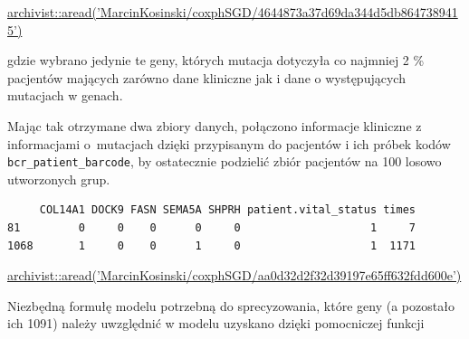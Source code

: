 \href{https://github.com/MarcinKosinski/coxphSGD/blob/master/gallery/4644873a37d69da344d5db8647389415.rda?raw=true}{archivist::aread('MarcinKosinski/coxphSGD/4644873a37d69da344d5db8647389415')}

gdzie wybrano jedynie te geny, których mutacja dotyczyła co najmniej 2
\% pacjentów mających zarówno dane kliniczne jak i dane o występujących
mutacjach w genach.

Mając tak otrzymane dwa zbiory danych, połączono informacje kliniczne z informacjami o~mutacjach dzięki przypisanym do
pacjentów i ich próbek kodów \texttt{bcr\_patient\_barcode}, by
ostatecznie podzielić zbiór pacjentów na 100 losowo utworzonych grup.

\begin{Shaded}
\begin{Highlighting}[]
\NormalTok{(}\NormalTok{)}
 \NormalTok{) ->}\StringTok{ }
\NormalTok{(coxData_split[[}\NormalTok{]][}\NormalTok{(}\NormalTok{,}\NormalTok{), }\NormalTok{(}\NormalTok{,}\NormalTok{,}\NormalTok{,}\NormalTok{,}\NormalTok{,}\NormalTok{:}\NormalTok{)])}
\end{Highlighting}
\end{Shaded}

\begin{verbatim}
     COL14A1 DOCK9 FASN SEMA5A SHPRH patient.vital_status times
81         0     0    0      0     0                    1     7
1068       1     0    0      1     0                    1  1171
\end{verbatim}

\href{https://github.com/MarcinKosinski/coxphSGD/blob/master/gallery/aa0d32d2f32d39197e65ff632fdd600e.rda?raw=true}{archivist::aread('MarcinKosinski/coxphSGD/aa0d32d2f32d39197e65ff632fdd600e')}

Niezbędną formułę modelu potrzebną do sprecyzowania, które geny (a
pozostało ich 1091) należy uwzględnić w modelu uzyskano dzięki
pomocniczej funkcji

\begin{Shaded}
\begin{Highlighting}[]
\StringTok{ }
\end{Highlighting}
\end{Shaded}

